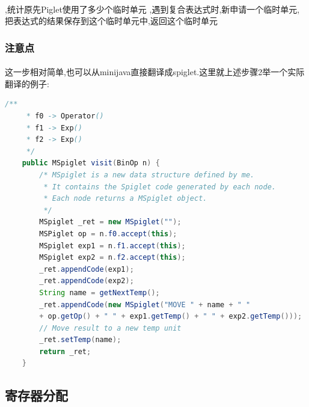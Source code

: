 \documentclass[11pt, oneside]{article}   	%
\begin{document}
\begin{spacing}{1.55}
	\paragraph{}
	\begin{enumerate}
	,统计原先Piglet使用了多少个临时单元
	,遇到复合表达式时,新申请一个临时单元,把表达式的结果保存到这个临时单元中,返回这个临时单元
	\end{enumerate}
	\subsubsection{注意点}
	\paragraph{}
	这一步相对简单,也可以从minijava直接翻译成spiglet.这里就上述步骤2举一个实际翻译的例子:
	\begin{lstlisting}[language=Java]
	/**
	 * f0 -> Operator()
	 * f1 -> Exp()
	 * f2 -> Exp()
	 */
	public MSpiglet visit(BinOp n) {
		/* MSpiglet is a new data structure defined by me.
		 * It contains the Spiglet code generated by each node.
		 * Each node returns a MSpiglet object.
		 */
		MSpiglet _ret = new MSpiglet("");
		MSPiglet op = n.f0.accept(this);
		MSpiglet exp1 = n.f1.accept(this);
		MSpiglet exp2 = n.f2.accept(this);
		_ret.appendCode(exp1);
		_ret.appendCode(exp2);
		String name = getNextTemp();
		_ret.appendCode(new MSpiglet("MOVE " + name + " " 
		+ op.getOp() + " " + exp1.getTemp() + " " + exp2.getTemp()));
		// Move result to a new temp unit
		_ret.setTemp(name);
		return _ret;
	}
	\end{lstlisting}
	\subsection{寄存器分配}

\end{spacing}
\end{document}
